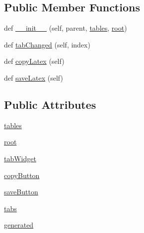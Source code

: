 \subsection*{Public Member Functions}
\begin{DoxyCompactItemize}
\item 
def \mbox{\hyperlink{classgetdist_1_1gui_1_1mainwindow_1_1DialogParamTables_ab629a683cf314c572955c1fb645f6658}{\+\_\+\+\_\+init\+\_\+\+\_\+}} (self, parent, \mbox{\hyperlink{classgetdist_1_1gui_1_1mainwindow_1_1DialogParamTables_a5209539873aec8e048202644bcbad9bb}{tables}}, \mbox{\hyperlink{classgetdist_1_1gui_1_1mainwindow_1_1DialogParamTables_ab130d002ccce5d3629891e12756e0607}{root}})
\item 
def \mbox{\hyperlink{classgetdist_1_1gui_1_1mainwindow_1_1DialogParamTables_af75bab99f7b1c92141dd199a261f722d}{tab\+Changed}} (self, index)
\item 
def \mbox{\hyperlink{classgetdist_1_1gui_1_1mainwindow_1_1DialogParamTables_a9da8a80d0e12fdf6c9e7ac1570b1f0e3}{copy\+Latex}} (self)
\item 
def \mbox{\hyperlink{classgetdist_1_1gui_1_1mainwindow_1_1DialogParamTables_a5b15ea8df2a02b958f00ee7f497516ad}{save\+Latex}} (self)
\end{DoxyCompactItemize}
\subsection*{Public Attributes}
\begin{DoxyCompactItemize}
\item 
\mbox{\hyperlink{classgetdist_1_1gui_1_1mainwindow_1_1DialogParamTables_a5209539873aec8e048202644bcbad9bb}{tables}}
\item 
\mbox{\hyperlink{classgetdist_1_1gui_1_1mainwindow_1_1DialogParamTables_ab130d002ccce5d3629891e12756e0607}{root}}
\item 
\mbox{\hyperlink{classgetdist_1_1gui_1_1mainwindow_1_1DialogParamTables_a0968575b3a5f92c9fc98e7515ed232a5}{tab\+Widget}}
\item 
\mbox{\hyperlink{classgetdist_1_1gui_1_1mainwindow_1_1DialogParamTables_a11642988862d24722defd4afd5c2e8b7}{copy\+Button}}
\item 
\mbox{\hyperlink{classgetdist_1_1gui_1_1mainwindow_1_1DialogParamTables_aa62ddca74c11657168e379fb7c18255b}{save\+Button}}
\item 
\mbox{\hyperlink{classgetdist_1_1gui_1_1mainwindow_1_1DialogParamTables_a515d504625ae98380124b8ec1e883eed}{tabs}}
\item 
\mbox{\hyperlink{classgetdist_1_1gui_1_1mainwindow_1_1DialogParamTables_a89451330e2b1983edab223c3a7e5e736}{generated}}
\end{DoxyCompactItemize}


